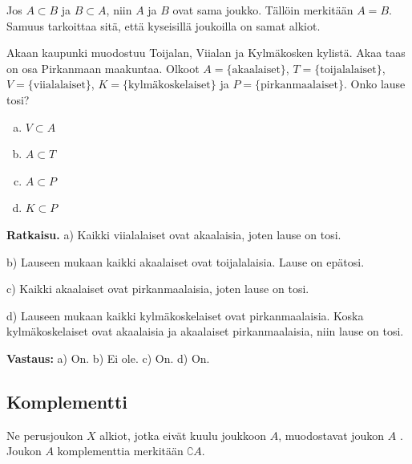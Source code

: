 Jos $A\subset B$ ja $B\subset A$, niin  $A$ ja $B$ ovat sama joukko. Tällöin merkitään $A=B$. Samuus tarkoittaa sitä, että kyseisillä joukoilla on samat alkiot. %

\begin{esimerkki}
Akaan kaupunki muodostuu Toijalan, Viialan ja Kylmäkosken
kylistä. Akaa taas on osa Pirkanmaan maakuntaa. Olkoot $A
= \{\textrm{akaalaiset}\}$, $T = \{\textrm{toijalalaiset}\}$, $V
= \{\textrm{viialalaiset}\}$, $K = \{\textrm{kylmäkoskelaiset}\} $ ja $P = \{\textrm{pirkanmaalaiset}\}$. Onko lause tosi?

\begin{enumerate}[a)]
\item $V \subset A$
\item $A \subset T$
\item $A \subset P$
\item $K \subset P$
\end{enumerate}


{\bf Ratkaisu.}
a) Kaikki viialalaiset ovat akaalaisia, joten lause on
tosi.

b) Lauseen mukaan kaikki akaalaiset ovat toijalalaisia.
Lause on epätosi.

c) Kaikki akaalaiset ovat pirkanmaalaisia, joten lause on
tosi.

d) Lauseen mukaan kaikki kylmäkoskelaiset ovat
pirkanmaalaisia. Koska kylmäkoskelaiset ovat akaalaisia
ja akaalaiset pirkanmaalaisia, niin lause on tosi.

{\bf Vastaus:} a) On. b) Ei ole. c) On. d) On.
\end{esimerkki}

\subsection*{Komplementti}
Ne perusjoukon $X$ alkiot, jotka eivät kuulu joukkoon $A$, muodostavat joukon $A$ . Joukon $A$ komplementtia merkitään $\complement A$.

\begin{center}



\end{center}

